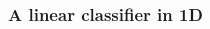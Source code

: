 \documentclass[compress]{beamer}
\newcommand{\1}{\mathbf{1}}
\begin{document}
\begin{frame}
\frametitle{A linear classifier in 1D}

\begin{columns}[t]
\begin{column}[T]{6cm}



\end{column}
\end{columns}
\end{frame}
\end{document}
